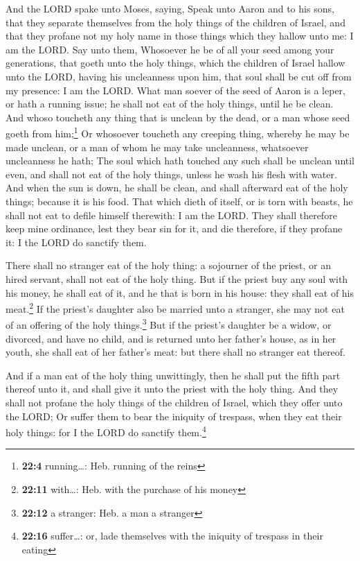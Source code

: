  And the LORD spake unto Moses, saying, 
Speak unto Aaron and to his sons, that they separate themselves from the
holy things of the children of Israel, and that they profane not my holy
name in those things which they hallow unto me: I am the LORD.
 Say unto them, Whosoever he be of all your seed among
your generations, that goeth unto the holy things, which the children of
Israel hallow unto the LORD, having his uncleanness upon him, that soul
shall be cut off from my presence: I am the LORD.  What
man soever of the seed of Aaron is a leper, or hath a running issue; he
shall not eat of the holy things, until he be clean. And whoso toucheth
any thing that is unclean by the dead, or a man whose seed goeth from
him;\footnote{\textbf{22:4} running\ldots: Heb. running of the reins}
 Or whosoever toucheth any creeping thing, whereby he may
be made unclean, or a man of whom he may take uncleanness, whatsoever
uncleanness he hath;  The soul which hath touched any such
shall be unclean until even, and shall not eat of the holy things,
unless he wash his flesh with water.  And when the sun is
down, he shall be clean, and shall afterward eat of the holy things;
because it is his food.  That which dieth of itself, or is
torn with beasts, he shall not eat to defile himself therewith: I am the
LORD.  They shall therefore keep mine ordinance, lest they
bear sin for it, and die therefore, if they profane it: I the LORD do
sanctify them.

 There shall no stranger eat of the holy thing: a
sojourner of the priest, or an hired servant, shall not eat of the holy
thing.  But if the priest buy any soul with his money, he
shall eat of it, and he that is born in his house: they shall eat of his
meat.\footnote{\textbf{22:11} with\ldots: Heb. with the purchase of his
  money}  If the priest's daughter also be married unto a
stranger, she may not eat of an offering of the holy things.\footnote{\textbf{22:12}
  a stranger: Heb. a man a stranger}  But if the priest's
daughter be a widow, or divorced, and have no child, and is returned
unto her father's house, as in her youth, she shall eat of her father's
meat: but there shall no stranger eat thereof.

 And if a man eat of the holy thing unwittingly, then he
shall put the fifth part thereof unto it, and shall give it unto the
priest with the holy thing.  And they shall not profane
the holy things of the children of Israel, which they offer unto the
LORD;  Or suffer them to bear the iniquity of trespass,
when they eat their holy things: for I the LORD do sanctify
them.\footnote{\textbf{22:16} suffer\ldots: or, lade themselves with the
  iniquity of trespass in their eating}

